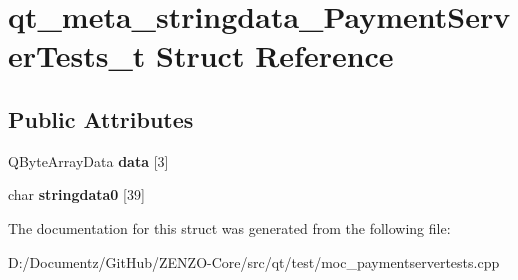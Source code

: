 \hypertarget{structqt__meta__stringdata___payment_server_tests__t}{}\section{qt\+\_\+meta\+\_\+stringdata\+\_\+\+Payment\+Server\+Tests\+\_\+t Struct Reference}
\label{structqt__meta__stringdata___payment_server_tests__t}
\subsection*{Public Attributes}
\begin{DoxyCompactItemize}
\item 
\mbox{\label{structqt__meta__stringdata___payment_server_tests__t_a31f8b6670da5fc9d460c42feeaeb5912}} 
Q\+Byte\+Array\+Data {\bfseries data} \mbox{[}3\mbox{]}
\item 
\mbox{\label{structqt__meta__stringdata___payment_server_tests__t_abb9aba1fbe71bab075c3bdc02426bec5}} 
char {\bfseries stringdata0} \mbox{[}39\mbox{]}
\end{DoxyCompactItemize}


The documentation for this struct was generated from the following file\+:\begin{DoxyCompactItemize}
\item 
D\+:/\+Documentz/\+Git\+Hub/\+Z\+E\+N\+Z\+O-\/\+Core/src/qt/test/moc\+\_\+paymentservertests.\+cpp\end{DoxyCompactItemize}
